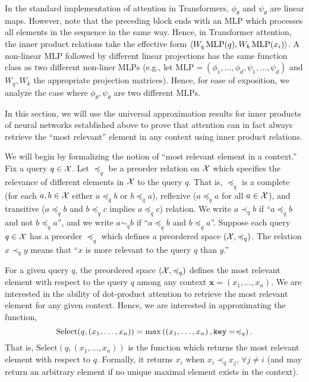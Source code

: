 \begin{remark}
    In the standard implementation of attention in Transformers, $\phi_\theta$ and $\psi_\theta$ are linear maps. However, note that the preceding block ends with an MLP which processes all elements in the sequence in the same way. Hence, in Transformer attention, the inner product relations take the effective form $\langle W_q \, \mathrm{MLP}(q), W_k \, \mathrm{MLP}(x_i) \rangle$. A non-linear MLP followed by different linear projections has the same function class as two different non-liner MLPs (e.g., let $\mathrm{MLP} = (\phi_1, \ldots, \phi_d, \psi_1, \ldots, \psi_d)$ and $W_q, W_k$ the appropriate projection matrices). Hence, for ease of exposition, we analyze the case where $\phi_\theta, \psi_\theta$ are two different MLPs.
\end{remark}

In this section, we will use the universal approximation results for inner products of neural networks established above to prove that attention can in fact always retrieve the ``most relevant'' element in any context using inner product relations.

We will begin by formalizing the notion of ``most relevant element in a context.'' Fix a query $q \in {\mathcal{X}}$. Let $\preceq_q$ be a preorder relation on ${\mathcal{X}}$ which specifies the relevance of different elements in ${\mathcal{X}}$ to the query $q$. That is, $\preceq_q$ is a complete (for each $a,b \in {\mathcal{X}}$ either $a \preceq_q b$ or $b \preceq_q a$), reflexive ($a \preceq_q a$ for all $a \in {\mathcal{X}}$), and transitive ($a \preceq_q b$ and $b \preceq_q c$ implies $a \preceq_q c$) relation.  We write $a \prec_q b$ if ``$a \preceq_q b$ and not $b \preceq_q a$'', and we write $a \sim_q b$ if ``$a \preceq_q b$ and $b \preceq_q a$''. Suppose each query $q \in {\mathcal{X}}$ has a preorder $\preceq_q$ which defines a preordered space $({\mathcal{X}}, \preccurlyeq_q)$. The relation $x \prec_q y$ means that ``$x$ is more relevant to the query $q$ than $y$.''

For a given query $q$, the preordered space $({\mathcal{X}}, \preccurlyeq_q)$ defines the most relevant element with respect to the query $q$ among any context $\bm{x} = (x_1, \ldots, x_n)$. We are interested in the ability of dot-product attention to retrieve the most relevant element for any given context. Hence, we are interested in approximating the function,
\begin{equation}\label{eq:def_select}
    \mathrm{Select}(q, (x_1, \ldots, x_n)) = \max\paren{\paren{x_1, \ldots, x_n}, \mathtt{key}=\preceq_q}.
\end{equation}
That is, $\mathrm{Select}(q, (x_1, \ldots, x_n))$ is the function which returns the most relevant element with respect to $q$. Formally, it returns $x_i$ when $x_i \prec_q x_j, \, \forall j \neq i$ (and may return an arbitrary element if no unique maximal element exists in the context).

